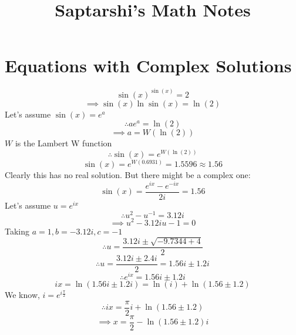 \documentclass[14pt]{article}
\begin{document}
	\title{Saptarshi's Math Notes}
	\maketitle
	\section{Equations with Complex Solutions}
	\begin{equation*}
	\sin(x)^{\sin(x)} = 2
	\end{equation*}
	\begin{equation*}
	\implies \sin(x)\ln\sin(x) = \ln(2)
	\end{equation*}
	Let's assume $\sin(x) = e^a$ 
	\begin{equation*}
	\therefore ae^a = \ln(2)
	\end{equation*}
	\begin{equation*}
	\implies a = W(\ln(2))
	\end{equation*}
	$W$ is the Lambert W function
	\begin{equation*}
	\therefore \sin(x) = e^{W(\ln(2))}
	\end{equation*}
	\begin{equation*}
	\sin(x) = e^{W(0.6931)} = 1.5596 \approx 1.56
	\end{equation*}
	Clearly this has no real solution. But there might be a complex one:
	\begin{equation*}
	\sin(x)=\frac{e^{ix}-e^{-ix}}{2i} = 1.56
	\end{equation*}
	Let's assume $u = e^{ix}$
	\begin{equation*}
	\therefore u^2-u^{-1} = 3.12i
	\end{equation*}
	\begin{equation*}
	\implies u^2-3.12iu-1 = 0
	\end{equation*}
	Taking $a=1, b=-3.12i, c=-1$
	\begin{equation*}
	\therefore u = \frac{3.12i \pm \sqrt{-9.7344+4}}{2}
	\end{equation*}
	\begin{equation*}
	\therefore u = \frac{3.12i \pm 2.4i}{2} = 1.56i \pm 1.2i
	\end{equation*}
	\begin{equation*}
	\therefore e^{ix} = 1.56i \pm 1.2i
	\end{equation*}
	\begin{equation*}
	ix = \ln(1.56i \pm 1.2i) = \ln(i) + \ln(1.56 \pm 1.2)
	\end{equation*}
	We know, $i = e^{i\frac{\pi}{2}}$
	\begin{equation*}
		\therefore ix = \frac{\pi}{2}i + \ln(1.56 \pm 1.2)
	\end{equation*}
	\begin{equation*}
		\implies \boxed{x = \frac{\pi}{2} - \ln(1.56 \pm 1.2)i}
	\end{equation*}
\end{document}
